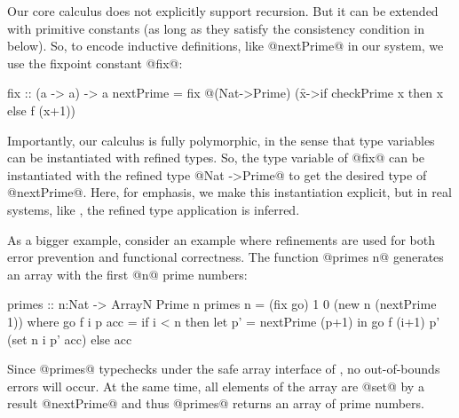 %
Our core calculus does not explicitly support recursion.
But it can be extended with primitive constants (as long as they satisfy 
the consistency condition in ~ below).
So, to encode inductive definitions, like @nextPrime@ in our system, we
use the fixpoint constant @fix@:
\begin{mcode}
  fix :: (a -> a) -> a
  nextPrime = fix @(Nat->Prime) (\f x->if checkPrime x then x else f (x+1))
\end{mcode}
Importantly, our calculus is fully polymorphic, in the sense that
type variables can be instantiated with refined types.
So, the type variable of @fix@ can be instantiated with
the refined type @Nat ->Prime@ to get the desired type of @nextPrime@.
Here, for emphasis, we make this instantiation explicit,
but in real systems, like
\href{http://goto.ucsd.edu:8090/index.html#?demo=permalink%2F1687971696_2572.hs}{\lh},
the refined type application is inferred.

%
As a bigger example, consider an example where refinements are used for both
error prevention and functional correctness.
%
The function @primes n@ generates an array with the first @n@ prime numbers:
%
\begin{code}
  primes :: n:Nat -> ArrayN Prime n
  primes n = (fix go) 1 0 (new n (nextPrime 1))
    where go f i p acc = if i < n
                               then let p' = nextPrime (p+1) in
                                      go f (i+1) p' (set n i p' acc)
                               else acc
\end{code}
%
Since @primes@ typechecks under the safe array interface of ,
no out-of-bounds errors will occur.
%
At the same time, all elements of the array are @set@ by a result @nextPrime@
and thus @primes@ returns an array of prime numbers.

